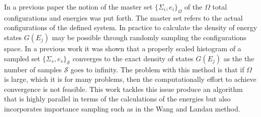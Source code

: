 \documentclass[twocolumn]{article}
\begin{document}
In a previous paper the notion of the master set $\{ \Sigma_i, e_i \}_\Omega $ of the $\Omega$ total configurations and energies was put forth. The master set refers to the actual configurations of the defined system. In practice to calculate the density of energy states $G(E_j)$  may be possible through randomly sampling the configurations space.  In a previous work it was shown that a properly scaled histogram of a sampled set $\{ \Sigma_s, e_s \}_\mathcal{S}$ converges to the exact density of states $G(E_j)$ as the the number of samples $\mathcal{S}$ goes to infinity. The problem with this method is that if $\Omega$ is large, which it is for many problems,  then the computationally effort to achieve convergence is not feasible.  This work tackles this issue produce an algorithm that is highly parallel in terms of the calculations of the energies  but also incorporates importance sampling such as in the Wang and Landau method. 
\end{document}
